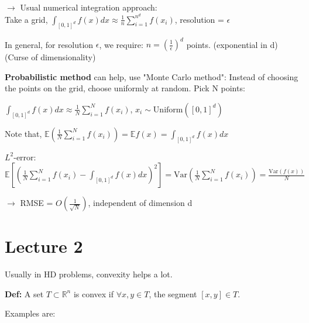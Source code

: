 \documentclass[12pt]{article}
\begin{document}
$\rightarrow$ Usual numerical integration approach: \\
Take a grid, 
$\int_{[0,1]^d} f(x) dx \approx \frac{1}{n} \sum_{i=1}^{n^d} f(x_i)$, resolution = $\epsilon$

In general, for resolution $\epsilon$, we require: $n = (\frac{1}{\epsilon})^d$ points. (exponential in d)\\
(Curse of dimensionality)

\textbf{Probabilistic method} can help, use "Monte Carlo method": Instead of choosing the points on the grid, choose uniformly at random. Pick N points:

$\int_{[0,1]^d} f(x) dx \approx \frac{1}{N} \sum_{i=1}^N f(x_i)$, $x_i \sim \text{Uniform}([0,1]^d)$

Note that, $\mathbb{E}(\frac{1}{N} \sum_{i=1}^N f(x_i)) = \mathbb{E}f(x) = \int_{[0,1]^d} f(x) dx$

$L^2$-error: $\mathbb{E}[(\frac{1}{N} \sum_{i=1}^N f(x_i) - \int_{[0,1]^d} f(x) dx)^2] = \text{Var}(\frac{1}{N} \sum_{i=1}^N f(x_i)) = \frac{\text{Var}(f(x))}{N}$

$\rightarrow$ RMSE = $O(\frac{1}{\sqrt{N}})$, independent of dimension d

\section*{Lecture 2}

Usually in HD problems, convexity helps a lot.

\textbf{Def:} A set $T \subset \mathbb{R}^n$ is convex if $\forall x,y \in T$, the segment $[x,y] \in T$.

Examples are:
\end{document}
